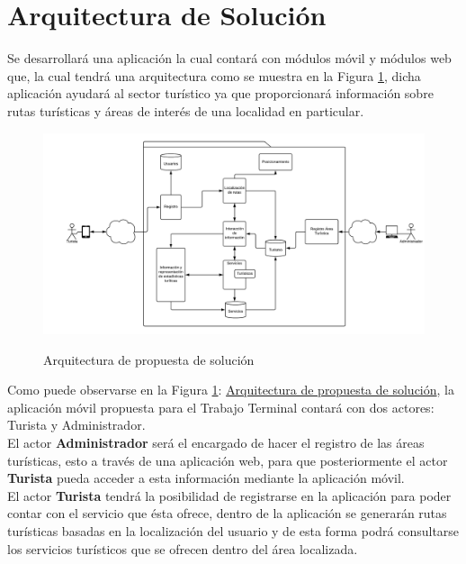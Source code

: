 \section{Arquitectura de Solución}
Se desarrollará una aplicación la cual contará con módulos móvil y módulos web que, la cual tendrá una arquitectura como se muestra en la Figura \ref{fig:arquitecturaPropuesta}, dicha aplicación ayudará al sector turístico ya que proporcionará información sobre rutas turísticas y áreas de interés de una localidad en particular.

\begin{figure}[htbp]
	\begin{center}
		\hypertarget{fig:arquitecturaPropuesta}{
			\includegraphics[angle=90, scale=.7]{propuestaSolicion/turismo/images/arquitecturaPropuesta}
			\caption{Arquitectura de propuesta de solución}
		}
		\label{fig:arquitecturaPropuesta}
	\end{center}
\end{figure}

\newpage
Como puede observarse en la Figura \ref{fig:arquitecturaPropuesta}: \hyperlink{fig:arquitecturaPropuesta}{Arquitectura de propuesta de solución}, la aplicación móvil propuesta para el Trabajo Terminal contará con dos actores: Turista y Administrador.\\

El actor \textbf{Administrador} será el encargado de hacer el registro de las áreas turísticas, esto a través de una aplicación web,  para que posteriormente el actor \textbf{Turista} pueda acceder a esta información mediante la aplicación móvil. \\

El actor \textbf{Turista} tendrá la posibilidad de registrarse en la aplicación para poder contar con el servicio que ésta ofrece, dentro de la aplicación se generarán rutas turísticas basadas en la localización del usuario y de esta forma podrá consultarse los servicios turísticos que se ofrecen dentro del área localizada.\\

